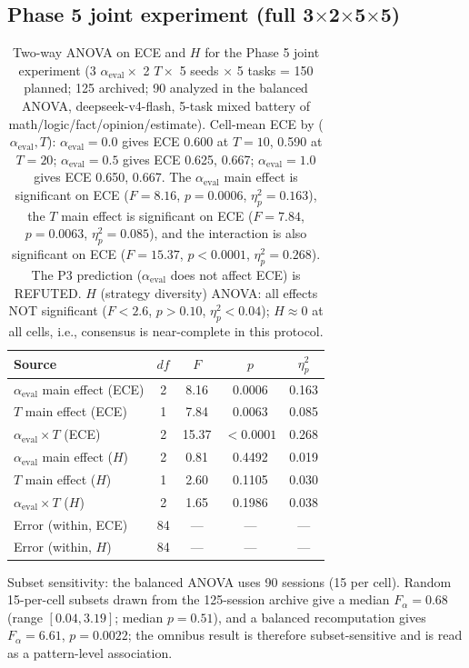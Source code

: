 \documentclass[11pt]{article}
\begin{document}
\subsection*{Phase 5 joint experiment (full 3$\times$2$\times$5$\times$5)}
\begin{table}[h]
\centering
\caption{Two-way ANOVA on ECE and $H$ for the Phase 5 joint experiment (3 $\alpha_{\text{eval}} \times$ 2 $T \times$ 5 seeds $\times$ 5 tasks = 150 planned; 125 archived; 90 analyzed in the balanced ANOVA, deepseek-v4-flash, 5-task mixed battery of math/logic/fact/opinion/estimate). Cell-mean ECE by ($\alpha_{\text{eval}}, T$): $\alpha_{\text{eval}}{=}0.0$ gives ECE 0.600 at $T{=}10$, 0.590 at $T{=}20$; $\alpha_{\text{eval}}{=}0.5$ gives ECE 0.625, 0.667; $\alpha_{\text{eval}}{=}1.0$ gives ECE 0.650, 0.667. The $\alpha_{\text{eval}}$ main effect is significant on ECE ($F = 8.16$, $p = 0.0006$, $\eta^2_p = 0.163$), the $T$ main effect is significant on ECE ($F = 7.84$, $p = 0.0063$, $\eta^2_p = 0.085$), and the interaction is also significant on ECE ($F = 15.37$, $p < 0.0001$, $\eta^2_p = 0.268$). The P3 prediction ($\alpha_{\text{eval}}$ does not affect ECE) is REFUTED. $H$ (strategy diversity) ANOVA: all effects NOT significant ($F < 2.6$, $p > 0.10$, $\eta^2_p < 0.04$); $H \approx 0$ at all cells, i.e., consensus is near-complete in this protocol.}
\label{tab:joint-full-v10}
\begin{tabular}{@{}lcccc@{}}
\toprule
\textbf{Source} & \textbf{$df$} & \textbf{$F$} & \textbf{$p$} & \textbf{$\eta^2_p$} \\
\midrule
$\alpha_{\text{eval}}$ main effect (ECE) & 2 & 8.16 & 0.0006 & 0.163 \\
$T$ main effect (ECE) & 1 & 7.84 & 0.0063 & 0.085 \\
$\alpha_{\text{eval}} \times T$ (ECE) & 2 & 15.37 & $< 0.0001$ & 0.268 \\
\midrule
$\alpha_{\text{eval}}$ main effect ($H$) & 2 & 0.81 & 0.4492 & 0.019 \\
$T$ main effect ($H$) & 1 & 2.60 & 0.1105 & 0.030 \\
$\alpha_{\text{eval}} \times T$ ($H$) & 2 & 1.65 & 0.1986 & 0.038 \\
\midrule
Error (within, ECE) & 84 & --- & --- & --- \\
Error (within, $H$) & 84 & --- & --- & --- \\
\bottomrule
\end{tabular}
\smallskip
{\footnotesize Subset sensitivity: the balanced ANOVA uses 90 sessions (15 per cell). Random 15-per-cell subsets drawn from the 125-session archive give a median $F_\alpha = 0.68$ (range $[0.04, 3.19]$; median $p = 0.51$), and a balanced recomputation gives $F_\alpha = 6.61$, $p = 0.0022$; the omnibus result is therefore subset-sensitive and is read as a pattern-level association.}
\end{table}
\end{document}
